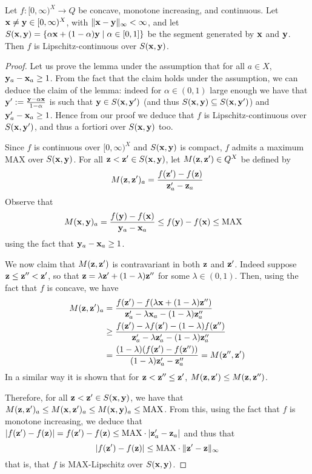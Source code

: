 \begin{lemma}
Let $f: [0,\infty)^{X}\to Q$ be concave, monotone increasing, and continuous.  
Let $\mathbf{x}\neq \mathbf{y}\in [0,\infty)^{X}$, with $\|\mathbf{x}-\mathbf{y}\|_{\infty}<\infty$, and let $S(\mathbf{x}, \mathbf{y})=\{ \alpha\mathbf{x} + (1-\alpha)\mathbf{y}\mid \alpha \in [0,1]\}$ be the segment generated by $\mathbf{x}$ and $\mathbf{y}$. 
Then $f$ is Lipschitz-continuous over $S(\mathbf{x}, \mathbf{y})$.

\end{lemma}
\begin{proof}
Let us prove the lemma under the assumption that for all $a\in X$, $\mathbf{y}_{a}-\mathbf{x}_{a}\geq 1$. From the fact that the claim holds under the assumption, we can deduce the claim of the lemma:
indeed for $\alpha\in (0,1)$ large enough we have that $\mathbf{y}':= \frac{\mathbf{y}-\alpha\mathbf{x}}{1-\alpha}$ is such that $\mathbf{y}\in S(\mathbf{x}, \mathbf{y}')$ (and thus $S(\mathbf{x}, \mathbf{y})\subseteq S(\mathbf{x}, \mathbf{y}')$) and 
$\mathbf{y}'_{a}-\mathbf{x}_{a}\geq 1$. Hence from our proof we deduce that $f$ is Lipschitz-continuous over $S(\mathbf{x}, \mathbf{y}')$, and thus a fortiori over $S(\mathbf{x}, \mathbf{y})$ too.


Since $f$ is continuous over $[0,\infty)^{X}$ and $S(\mathbf{x}, \mathbf{y})$ is compact, $f$ admits a maximum $\mathrm{MAX}$ over $S(\mathbf{x}, \mathbf{y})$.
For all $\mathbf{z}< \mathbf{z}'\in S(\mathbf{x}, \mathbf{y})$, let $M(\mathbf{z}, \mathbf{z}')\in Q^{X}$ be defined by
$$
M(\mathbf{z}, \mathbf{z}')_{a}= \frac{f(\mathbf{z}')-f(\mathbf{z})}{\mathbf{z}'_{a}-\mathbf{z}_{a}}
$$
Observe that
\begin{align*}
M(\mathbf{x}, \mathbf{y})_{a} & = \frac{f(\mathbf{y})-f(\mathbf{x})}{\mathbf{y}_{a}-\mathbf{x}_{a}} \leq 
f(\mathbf{y})-f(\mathbf{x}) \leq \mathrm{MAX}
\end{align*}
using the fact that $\mathbf{y}_{a}-\mathbf{x}_{a}\geq 1$. 

We now claim that $M(\mathbf{z}, \mathbf{z}')$ is contravariant in both $\mathbf{z}$ and $\mathbf{z}'$. 
Indeed suppose $\mathbf{z}\leq \mathbf{z}'' < \mathbf{z}'$, so that $\mathbf{z}= \lambda \mathbf{z}' +(1-\lambda)\mathbf{z}''$ for some $\lambda \in (0,1)$. Then, using the fact that $f$ is concave, we have 
\begin{align*}
M(\mathbf{z}, \mathbf{z}')_{a}&=\frac{f(\mathbf{z}')-f(\lambda \mathbf{x} +(1-\lambda)\mathbf{z}'')}{\mathbf{z}'_{a}-\lambda \mathbf{x}_{a} -(1-\lambda)\mathbf{z}''_{a}} \\
&
\geq 
\frac{f(\mathbf{z}')-\lambda f(\mathbf{z}') -(1-\lambda)f(\mathbf{z}'')}{\mathbf{z}'_{a}-\lambda \mathbf{z}'_{a} -(1-\lambda)\mathbf{z}''_{a}} \\
&
= 
\frac{(1-\lambda)(f(\mathbf{z}')-f(\mathbf{z}''))}{(1-\lambda )\mathbf{z}'_{a}-\mathbf{z}''_{a}} =M(\mathbf{z}'', \mathbf{z}')
\end{align*}
In a similar way it is shown that for $\mathbf{z} < \mathbf{z}''\leq \mathbf{z}'$, $M(\mathbf{z},\mathbf{z}')\leq M(\mathbf{z}, \mathbf{z}'')$. 

Therefore, for all $\mathbf{z} < \mathbf{z}'\in S(\mathbf{x}, \mathbf{y})$, we have that $M(\mathbf{z}, \mathbf{z}')_{a} \leq M(\mathbf{x}, \mathbf{z}')_{a} \leq M(\mathbf{x}, \mathbf{y})_{a} \leq \mathrm{MAX}$. 
From this, using the fact that $f$ is monotone increasing, we deduce that 
$|f(\mathbf{z}')-f(\mathbf{z})|=f(\mathbf{z}')-f(\mathbf{z}) \leq \mathrm{MAX}\cdot |\mathbf{z}'_{a}-\mathbf{z}_{a}|
$ and thus that 
$$|f(\mathbf{z}')-f(\mathbf{z})|\leq \mathrm{MAX}\cdot \|\mathbf{z}'-\mathbf{z}\|_{\infty}$$
that is, that $f$ is $\mathrm{MAX}$-Lipschitz over $S(\mathbf{x}, \mathbf{y})$. 
\end{proof}

